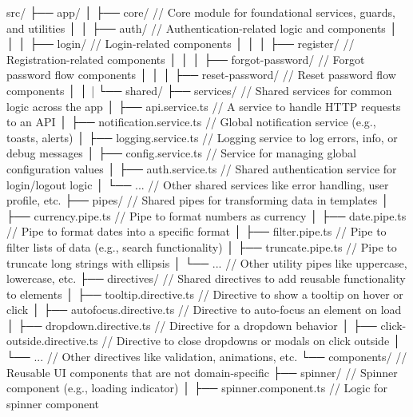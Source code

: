 src/
├── app/
│   ├── core/                            // Core module for foundational services, guards, and utilities
│   │   ├── auth/                        // Authentication-related logic and components
│   │   │   ├── login/                   // Login-related components
│   │   │   ├── register/                // Registration-related components
│   │   │   ├── forgot-password/         // Forgot password flow components
│   │   │   ├── reset-password/          // Reset password flow components
│   │   |                    
        └── shared/
            ├── services/                 // Shared services for common logic across the app
            │   ├── api.service.ts        // A service to handle HTTP requests to an API
            │   ├── notification.service.ts // Global notification service (e.g., toasts, alerts)
            │   ├── logging.service.ts    // Logging service to log errors, info, or debug messages
            │   ├── config.service.ts     // Service for managing global configuration values
            │   ├── auth.service.ts       // Shared authentication service for login/logout logic
            │   └── ...                   // Other shared services like error handling, user profile, etc.
            ├── pipes/                    // Shared pipes for transforming data in templates
            │   ├── currency.pipe.ts      // Pipe to format numbers as currency
            │   ├── date.pipe.ts          // Pipe to format dates into a specific format
            │   ├── filter.pipe.ts        // Pipe to filter lists of data (e.g., search functionality)
            │   ├── truncate.pipe.ts      // Pipe to truncate long strings with ellipsis
            │   └── ...                   // Other utility pipes like uppercase, lowercase, etc.
            ├── directives/               // Shared directives to add reusable functionality to elements
            │   ├── tooltip.directive.ts  // Directive to show a tooltip on hover or click
            │   ├── autofocus.directive.ts // Directive to auto-focus an element on load
            │   ├── dropdown.directive.ts // Directive for a dropdown behavior
            │   ├── click-outside.directive.ts // Directive to close dropdowns or modals on click outside
            │   └── ...                   // Other directives like validation, animations, etc.
            └── components/                // Reusable UI components that are not domain-specific
                ├── spinner/               // Spinner component (e.g., loading indicator)
                │   ├── spinner.component.ts  // Logic for spinner component
